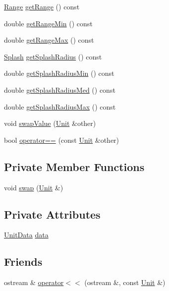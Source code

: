 \begin{DoxyCompactItemize}
\item 
\hyperlink{structghost_1_1Range}{Range} \hyperlink{classghost_1_1Unit_af894e826de43cec0b700c9db178b560e}{get\-Range} () const 
\item 
double \hyperlink{classghost_1_1Unit_a118c4fce326cfef9b9c983963a1c985d}{get\-Range\-Min} () const 
\item 
double \hyperlink{classghost_1_1Unit_ac1b57bea07978d0efd265079028902aa}{get\-Range\-Max} () const 
\item 
\hyperlink{structghost_1_1Splash}{Splash} \hyperlink{classghost_1_1Unit_a8b9273df4f0ead9d0f6f4cec0052c654}{get\-Splash\-Radius} () const 
\item 
double \hyperlink{classghost_1_1Unit_ad37d8cd2027e8cb0b3e022fc7cfdaba7}{get\-Splash\-Radius\-Min} () const 
\item 
double \hyperlink{classghost_1_1Unit_ae1a04592a47847a7cbb5b9aac284bbc6}{get\-Splash\-Radius\-Med} () const 
\item 
double \hyperlink{classghost_1_1Unit_ab17ecf5e83a4ee3461a4d17f9bd39acf}{get\-Splash\-Radius\-Max} () const 
\item 
void \hyperlink{classghost_1_1Unit_a5d3a0d6bb9da6fde7ea1cf2e3b50c970}{swap\-Value} (\hyperlink{classghost_1_1Unit}{Unit} \&other)
\item 
bool \hyperlink{classghost_1_1Unit_a897f79bb428f28937a8c61b27c3def91}{operator==} (const \hyperlink{classghost_1_1Unit}{Unit} \&other)
\end{DoxyCompactItemize}
\subsection*{Private Member Functions}
\begin{DoxyCompactItemize}
\item 
void \hyperlink{classghost_1_1Unit_ac351094feab1278c4a8b81ba74215336}{swap} (\hyperlink{classghost_1_1Unit}{Unit} \&)
\end{DoxyCompactItemize}
\subsection*{Private Attributes}
\begin{DoxyCompactItemize}
\item 
\hyperlink{structghost_1_1UnitData}{Unit\-Data} \hyperlink{classghost_1_1Unit_a7ca43892e28cb7df114d17cb297d6617}{data}
\end{DoxyCompactItemize}
\subsection*{Friends}
\begin{DoxyCompactItemize}
\item 
ostream \& \hyperlink{classghost_1_1Unit_adfd98717a4a81282f3323f91a123bbe0}{operator$<$$<$} (ostream \&, const \hyperlink{classghost_1_1Unit}{Unit} \&)
\end{DoxyCompactItemize}
